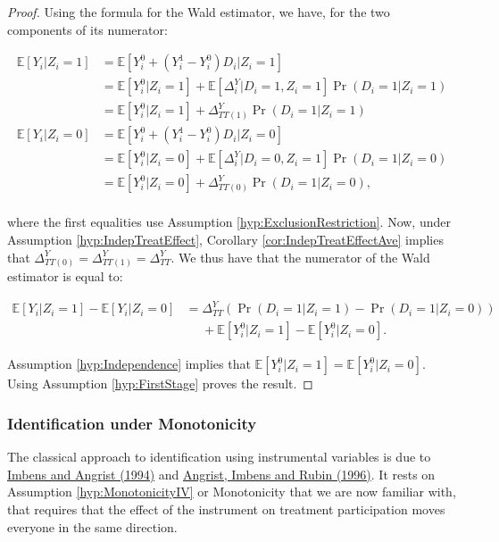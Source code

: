\documentclass[
]{book}
\newcommand{\esp}[1]{\mathbb{E}[ #1 ]}
\theoremstyle{definition}
\theoremstyle{definition}
\theoremstyle{definition}
\theoremstyle{definition}
\theoremstyle{remark}
\begin{document}
\begin{proof}
\iffalse{} {Proof. } \fi{}Using the formula for the Wald estimator, we have, for the two components of its numerator:

\begin{align*}
\esp{Y_i|Z_i=1} & = \esp{Y_i^0+(Y_i^1-Y_i^0)D_i|Z_i=1} \\
                & = \esp{Y_i^0|Z_i=1}+\esp{\Delta^Y_i|D_i=1,Z_i=1}\Pr(D_i=1|Z_i=1)\\
                & = \esp{Y_i^0|Z_i=1}+\Delta^Y_{TT(1)}\Pr(D_i=1|Z_i=1)\\
\esp{Y_i|Z_i=0} & = \esp{Y_i^0+(Y_i^1-Y_i^0)D_i|Z_i=0} \\
                & = \esp{Y_i^0|Z_i=0}+\esp{\Delta^Y_i|D_i=0,Z_i=1}\Pr(D_i=1|Z_i=0)\\
                & = \esp{Y_i^0|Z_i=0}+\Delta^Y_{TT(0)}\Pr(D_i=1|Z_i=0),\\
\end{align*}

where the first equalities use Assumption \ref{hyp:ExclusionRestriction}.
Now, under Assumption \ref{hyp:IndepTreatEffect}, Corollary \ref{cor:IndepTreatEffectAve} implies that \(\Delta^Y_{TT(0)}=\Delta^Y_{TT(1)}=\Delta^Y_{TT}\).
We thus have that the numerator of the Wald estimator is equal to:

\begin{align*}
\esp{Y_i|Z_i=1}-\esp{Y_i|Z_i=0} & = \Delta^Y_{TT}(\Pr(D_i=1|Z_i=1)-\Pr(D_i=1|Z_i=0))\\
                                & \phantom{=}+\esp{Y_i^0|Z_i=1}-\esp{Y_i^0|Z_i=0}.
\end{align*}

Assumption \ref{hyp:Independence} implies that \(\esp{Y_i^0|Z_i=1}=\esp{Y_i^0|Z_i=0}\).
Using Assumption \ref{hyp:FirstStage} proves the result.
\end{proof}

\hypertarget{identification-under-monotonicity}{%
\subsubsection{Identification under Monotonicity}\label{identification-under-monotonicity}}

The classical approach to identification using instrumental variables is due to \href{https://www.jstor.org/stable/2951620}{Imbens and Angrist (1994)} and \href{https://www.jstor.org/stable/2291629}{Angrist, Imbens and Rubin (1996)}.
It rests on Assumption \ref{hyp:MonotonicityIV} or Monotonicity that we are now familiar with, that requires that the effect of the instrument on treatment participation moves everyone in the same direction.
\end{document}
